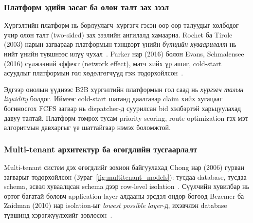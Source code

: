 \subsubsection{Платформ эдийн засаг ба олон талт зах зээл}
\label{subsubsec:platform_economics}

Хүргэлтийн платформ нь борлуулагч–хүргэгч гэсэн өөр өөр талуудыг холбодог учир олон талт (two-sided) зах зээлийн ангилалд хамаарна. Rochet ба Tirole (2003) нарын загвараар платформын тэнцвэрт үнийн \emph{бүтцийн хуваарилалт} нь нийт үнийн түвшнээс илүү чухал~\cite{rochet2003platform}. Parker нар (2016) болон Evans, Schmalensee (2016) сүлжээний эффект (network effect), матч хийх үр ашиг, cold-start асуудлыг платформын гол хөдөлгөгчүүд гэж тодорхойлсон~\cite{parker2016platform, evans2016matchmakers}.

Эдгээр онолын үүднээс B2B хүргэлтийн платформын гол саад нь \emph{хүргэгч талын liquidity} болдог. Иймээс cold-start шатанд даалгавар claim хийх хугацааг богиносгох FCFS загвар нь dispatcher-д суурилсан bid хэлбэртэй харьцуулахад давуу талтай. Платформ томрох тусам priority scoring, route optimization гэх мэт алгоритмын давхаргыг үе шаттайгаар нэмэх боломжтой.

\subsubsection{Multi-tenant архитектур ба өгөгдлийн тусгаарлалт}
\label{subsubsec:multitenancy}

Multi-tenant систем дэх өгөгдлийг зохион байгуулахад Chong нар (2006) гурван загварыг тодорхойлсон (Зураг~\ref{fig:multitenant_models}): тусдаа database, тусдаа schema, эсвэл хуваалцсан schema дээр row-level isolation~\cite{chong2006multitenant}. Сүүлчийн хувилбар нь өртөг багатай боловч application-layer алдааны эрсдэл өндөр бөгөөд Bezemer ба Zaidman (2010) нар isolation-ыг \emph{lowest possible layer}-д, ихэвчлэн database түвшинд хэрэгжүүлэхийг зөвлөсөн~\cite{bezemer2010multitenant}.

